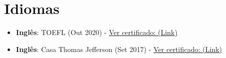 \documentclass[letterpaper,11pt]{article}%
\begin{document}
\section*{Idiomas}%
\label{sec:Idiomas}%
\begin{itemize}[leftmargin=0.15in, label={}]%
\item%
\textbf{Inglês}: TOEFL (Out 2020) - \href{https://github.com/s33ding/my_resume/blob/main/my_certificates/english_TOEFL_my_score.pdf}{Ver certificado: (Link)}%
\item%
\textbf{Inglês}: Casa Thomas Jefferson (Set 2017) - \href{https://github.com/s33ding/my_resume/blob/main/my_certificates/english_Casa%20Thomas%20Jefferson.pdf}{Ver certificado: (Link)}%
\end{itemize}

%
\end{document}
